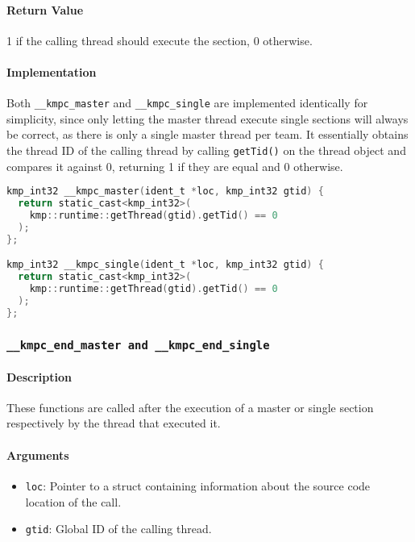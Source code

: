 \paragraph{Return Value} 1 if the calling thread should execute the section, 0 otherwise.

\paragraph{Implementation} Both \texttt{\_\_kmpc\_master} and \texttt{\_\_kmpc\_single} are
implemented identically for simplicity, since only letting the master thread execute single sections
will always be correct, as there is only a single master thread per team. It essentially obtains the
thread ID of the calling thread by calling \texttt{getTid()} on the thread object and compares it
against 0, returning 1 if they are equal and 0 otherwise.

\begin{lstlisting}[language=C, caption={__kmpc_master and __kmpc_single},
                   label={lst:kmpc-master}, escapechar=@]
kmp_int32 __kmpc_master(ident_t *loc, kmp_int32 gtid) {
  return static_cast<kmp_int32>(
    kmp::runtime::getThread(gtid).getTid() == 0
  );
};

kmp_int32 __kmpc_single(ident_t *loc, kmp_int32 gtid) {
  return static_cast<kmp_int32>(
    kmp::runtime::getThread(gtid).getTid() == 0
  );
};
\end{lstlisting}

\subsubsection{\texttt{__kmpc_end_master and __kmpc_end_single}}

\paragraph{Description} These functions are called after the execution of a master or single section
respectively by the thread that executed it.

\paragraph{Arguments}
\begin{itemize}
	\item \texttt{loc}: Pointer to a struct containing information about the source code location
	      of the call.
	\item \texttt{gtid}: Global ID of the calling thread.
\end{itemize}

